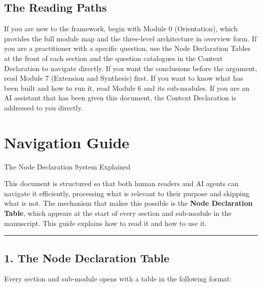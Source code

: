 \documentclass[
  11pt,
  a4paper,
  twoside,
  openright]{scrbook}
\begin{document}
\section{The Reading Paths}\label{the-reading-paths}

If you are new to the framework, begin with Module 0 (Orientation),
which provides the full module map and the three-level architecture in
overview form. If you are a practitioner with a specific question, use
the Node Declaration Tables at the front of each section and the
question catalogues in the Context Declaration to navigate directly. If
you want the conclusions before the argument, read Module 7 (Extension
and Synthesis) first. If you want to know what has been built and how to
run it, read Module 6 and its sub-modules. If you are an AI assistant
that has been given this document, the Context Declaration is addressed
to you directly.

\chapter{Navigation Guide}\label{navigation-guide}

The Node Declaration System Explained

\hfill\break

This document is structured so that both human readers and AI agents can
navigate it efficiently, processing what is relevant to their purpose
and skipping what is not. The mechanism that makes this possible is the
\textbf{Node Declaration Table}, which appears at the start of every
section and sub-module in the manuscript. This guide explains how to
read it and how to use it.

\begin{center}\rule{0.5\linewidth}{0.5pt}\end{center}

\section{1. The Node Declaration
Table}\label{the-node-declaration-table}

Every section and sub-module opens with a table in the following format:
\end{document}

